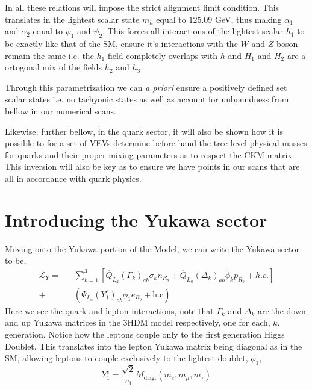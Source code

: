 In all these relations will impose the strict alignment limit condition. This translates in the lightest scalar state $m_h$ equal to $125.09$ GeV, thus making $\alpha_1$ and $\alpha_2$ equal to $\psi_1$ and $\psi_2$. 
%
This forces all interactions of the lightest scalar $h_1$ to be exactly like that of the SM, ensure it's interactions with the $W$ and $Z$ boson remain the same i.e. the $h_1$ field completely overlaps with $h$ and $H_1$ and $H_2$ are a ortogonal mix of the fields $h_2$ and $h_3$. 

Through this parametrization we can \textit{a priori} ensure a positively defined set scalar states i.e. no tachyonic states as well as account for unboundness from bellow in our numerical scans. 

Likewise, further bellow, in the quark sector, it will also be shown how it is possible to for a set of VEVs determine before hand the tree-level physical masses for quarks and their proper mixing parameters as to respect the CKM matrix. This inversion will also be key as to ensure we have points in our scans that are all in accordance with quark physics. 


\section{Introducing the Yukawa sector}

Moving onto the Yukawa portion of the Model, we can write the Yukawa sector to be,
\begin{equation} \label{eq:3HDM_Yuk} \begin{split} 
\mathcal{L}_Y = - & \sum_{k=1}^3 \left[ \overline{Q}_{L_a} \left( \Gamma_k \right)_{ab} \sigma_k n_{R_b} + \overline{Q}_{L_a} \left( \Delta_k \right)_{ab} \tilde{\phi}_k p_{R_b} + h.c.  \right] \\ + & \left( \Psi_{L_a} \left( Y^e_1 \right)_{ab} \phi_1 e_{R_b} + \text{h.c} \right)
\end{split} \end{equation}   
Here we see the quark and lepton interactions, note that $\Gamma_k$ and $\Delta_k$ are the down and up Yukawa matrices in the 3HDM model respectively, one for each, $k$, generation.
%
Notice how the leptons couple only to the first generation Higgs Doublet. 
%
This translates into the lepton Yukawa matrix being diagonal as in the SM, allowing leptons to couple exclusively to the lightest doublet, $\phi_1$, 
%
\begin{equation}
Y^e_1 = \frac{\sqrt{2}}{v_1} M_{\text{diag.}}\left( m_e , m_\mu , m_\tau \right)
\end{equation} 

